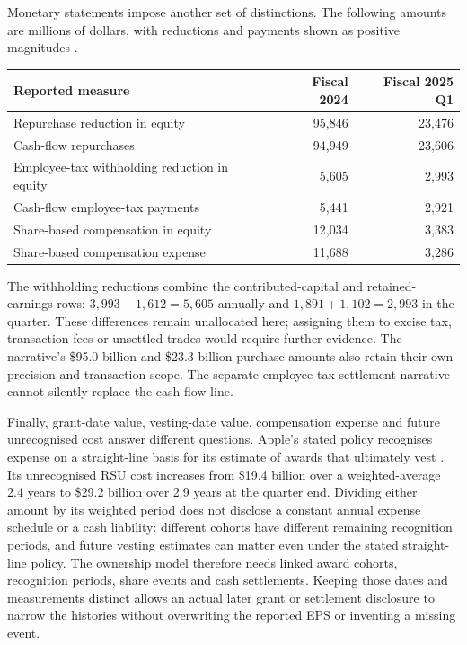 Monetary statements impose another set of distinctions. The following amounts
are millions of dollars, with reductions and payments shown as positive
magnitudes \citep[printed pp.~32--33 and 45]{apple2024}
\citep[printed pp.~4--5 and 10]{apple2025q1}.
\begin{center}
\small
\begin{tabular}{@{}lrr@{}}
\toprule
Reported measure & Fiscal 2024 & Fiscal 2025 Q1 \\
\midrule
Repurchase reduction in equity & 95,846 & 23,476 \\
Cash-flow repurchases & 94,949 & 23,606 \\
Employee-tax withholding reduction in equity & 5,605 & 2,993 \\
Cash-flow employee-tax payments & 5,441 & 2,921 \\
Share-based compensation in equity & 12,034 & 3,383 \\
Share-based compensation expense & 11,688 & 3,286 \\
\bottomrule
\end{tabular}
\end{center}
The withholding reductions combine the contributed-capital and retained-earnings
rows: $3{,}993+1{,}612=5{,}605$ annually and $1{,}891+1{,}102=2{,}993$ in the
quarter. These differences remain unallocated here; assigning them to excise
tax, transaction fees or unsettled trades would require further evidence.
The narrative's \$95.0 billion and \$23.3 billion purchase amounts also retain
their own precision and transaction scope. The separate employee-tax settlement
narrative cannot silently replace the cash-flow line.

Finally, grant-date value, vesting-date value, compensation expense and future
unrecognised cost answer different questions. Apple's stated policy recognises
expense on a straight-line basis for its estimate of awards that ultimately
vest \citep[Note 1, printed p.~34]{apple2024}. Its unrecognised RSU cost
increases from \$19.4 billion over a weighted-average 2.4 years to \$29.2 billion
over 2.9 years at the quarter end. Dividing either amount by its weighted period
does not disclose a constant annual expense schedule or a cash liability:
different cohorts have different remaining recognition periods, and future
vesting estimates can matter even under the stated straight-line policy.
The ownership model therefore needs linked award cohorts, recognition periods,
share events and cash settlements. Keeping those dates and measurements distinct
allows an actual later grant or settlement disclosure to narrow the histories
without overwriting the reported EPS or inventing a missing event.
